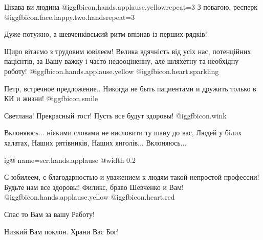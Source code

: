  
 
 
 
 
\zzSecCmt

\begin{itemize} %

Цікава ви людина  @igg{fbicon.hands.applause.yellow}{repeat=3}  З повагою,
респерк  @igg{fbicon.face.happy.two.hands}{repeat=3} 


Дуже потужно, а шевченківський ритм впізнав із перших рядків!


Щиро вітаємо з трудовим ювілеєм! Велика вдячність від усіх нас, потенційних
пацієнтів, за Вашу важку і часто недооціненну, але шляхетну та необхідну
роботу! @igg{fbicon.hands.applause.yellow}  @igg{fbicon.heart.sparkling} 

\begin{itemize} %
Петр, встречное предложение.. Никогда не быть пациентами и дружить только в КИ и жизни! @igg{fbicon.smile} 

Светлана! Прекрасный тост! Пусть все будут здоровы!  @igg{fbicon.wink} 
\end{itemize} %


Вклоняюсь... ніякими словами не висловити ту шану до вас, Людей у білих халатах,
Наших рятівників, Наших янголів... Вклоняюсь...


\ifcmt
  ig@ name=scr.hands.applause
  @width 0.2
\fi


С юбилеем, с благодарностью и уважением к людям такой непростой профессии! Будьте нам все здоровы!
Филикс, браво Шевченко и Вам!
 @igg{fbicon.hands.applause.yellow}  @igg{fbicon.heart.red}

Спас то Вам за вашу Работу!

Низкий Вам поклон. Храни Вас Бог!



\end{itemize}
